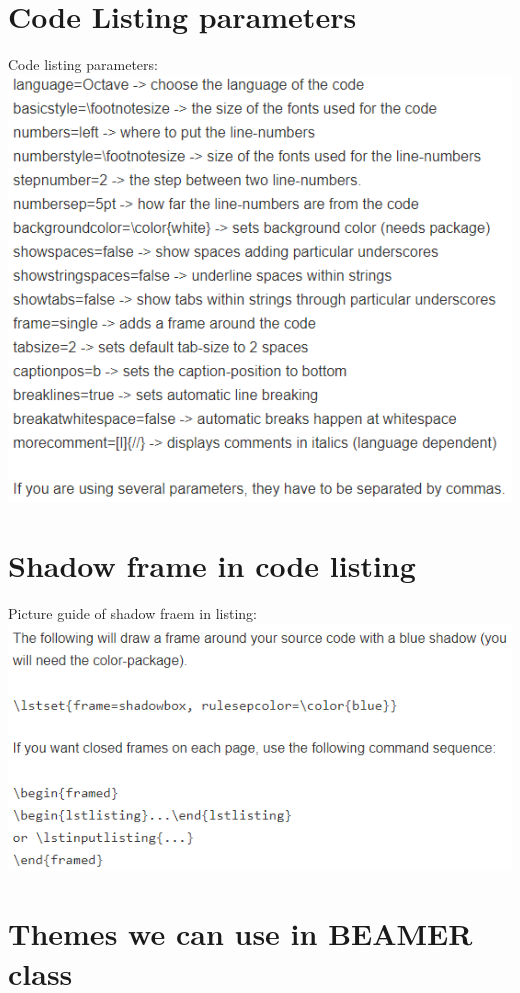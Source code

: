 \documentclass[11 pt]{book}
\begin{document}
\section{Code Listing parameters}
Code listing parameters:\\
\includegraphics[scale=1]{../Code listing parameters.png} 

\section{Shadow frame in code listing}
Picture guide of shadow fraem in listing:\\
\includegraphics[scale=1]{../Shadow frame in code listing.png}

\section{Themes we can use in BEAMER class}
\end{document}
